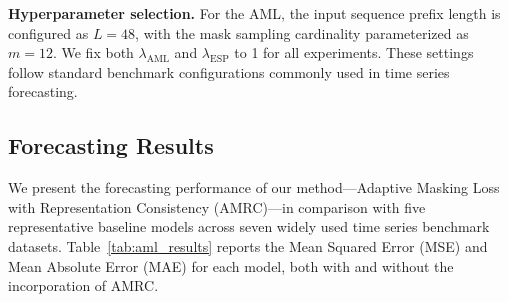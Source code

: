 \documentclass{article}
\begin{document}

\textbf{Hyperparameter selection.} For the AML, the input sequence prefix length is configured as $L=48$, with the mask sampling cardinality parameterized as $m=12$. We fix both $\lambda_{\mathrm{AML}}$ and $\lambda_{\mathrm{ESP}}$ to 1 for all experiments. These settings follow standard benchmark configurations commonly used in time series forecasting.


\subsection{Forecasting Results}

We present the forecasting performance of our method—Adaptive Masking Loss with Representation Consistency (AMRC)—in comparison with five representative baseline models across seven widely used time series benchmark datasets. Table~\ref{tab:aml_results} reports the Mean Squared Error (MSE) and Mean Absolute Error (MAE) for each model, both with and without the incorporation of AMRC. 
\end{document}
